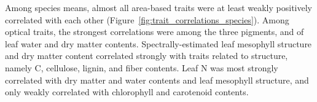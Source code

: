 Among species means, almost all area-based traits were at least weakly positively correlated with each other (Figure~\ref{fig:trait_correlations_species}).
Among optical traits, the strongest correlations were among the three pigments, and of leaf water and dry matter contents.
Spectrally-estimated leaf mesophyll structure and dry matter content correlated strongly with traits related to structure, namely C, cellulose, lignin, and fiber contents.
Leaf N was most strongly correlated with dry matter and water contents and leaf mesophyll structure, and only weakly correlated with chlorophyll and carotenoid contents.
